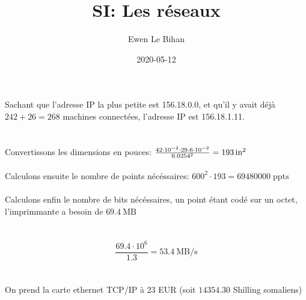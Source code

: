 \documentclass{article}
\title{SI: Les réseaux}
\author{Ewen Le Bihan}
\date{2020-05-12}
\begin{document}
\maketitle

\section{}

Sachant que l'adresse IP la plus petite est 156.18.0.0, et qu'il y avait déjà $242+26=268$ machines connectées, l'adresse IP est 156.18.1.11.

\section{}
\paragraph{}
Convertissons les dimensions en pouces: $\frac{42\cdot10^{-2}\cdot29.6\cdot10^{-2}}{0.0254^2} = \SI{193}{\text{in}\squared}$

\paragraph{}
Calculons ensuite le nombre de points nécéssaires: $600^2\cdot193=69480000\;\text{ppts}$

\paragraph{}
Calculons enfin le nombre de bits nécéssaires, un point étant codé sur un octet, l'imprimmante a besoin de $\SI{69.4}{\mega\text{B}}$ 

\section{}

\begin{equation*}
    \frac{69.4\cdot10^6}{1.3} = \SI{53.4}{\mega\text{B}\per\second}
\end{equation*}

\section{}

On prend la carte ethernet TCP/IP à 23 EUR (soit $14354.30$ Shilling somaliens)
\end{document}
